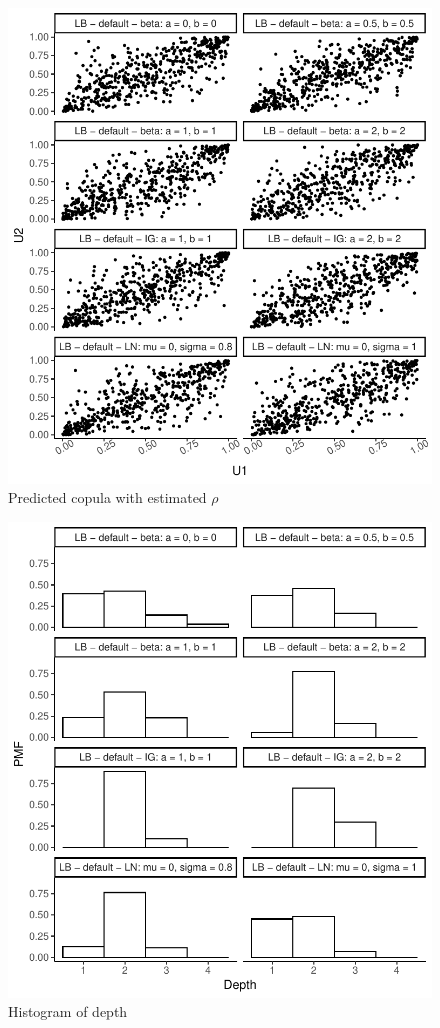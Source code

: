 \documentclass{amsart}
\begin{document}
\begin{figure}[ht]
	\centering
	\includegraphics[width=0.95\linewidth]{simulated_copula_3.pdf}
	\caption{Predicted copula with estimated $\rho$}
	\label{fig:sim:copula:3}
\end{figure}

%
\begin{figure}[ht]
	\centering
	\includegraphics[width=0.95\linewidth]{hist_depth_4.pdf}
	\caption{Histogram of depth}
	\label{fig:hist:depth:4}
\end{figure}
\end{document}
